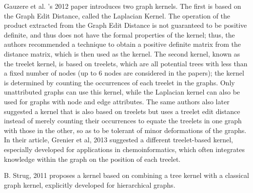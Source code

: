 Gauzere et al. 's 2012 paper introduces two graph kernels. The first is based on the Graph Edit Distance, called the Laplacian Kernel. The operation of the product extracted from the Graph Edit Distance is not guaranteed to be positive definite, and thus does not have the formal properties of the kernel; thus, the authors recommended a technique to obtain a positive definite matrix from the distance matrix, which is then used as the kernel. The second kernel, known as the treelet kernel, is based on treelets, which are all potential trees with less than a fixed number of nodes (up to 6 nodes are considered in the papers); the kernel is determined by counting the occurrences of each treelet in the graphs. Only unattributed graphs can use this kernel, while the Laplacian kernel can also be used for graphs with node and edge attributes. The same authors also later suggested a kernel that is also based on treelets but uses a treelet edit distance instead of merely counting their occurrences to equate the treelets in one graph with those in the other, so as to be tolerant of minor deformations of the graphs. In their article, Grenier et al, 2013 suggested a different treelet-based kernel, especially developed for applications in chemoinformatics, which often integrates knowledge within the graph on the position of each treelet. 

B. Strug, 2011 proposes a kernel based on combining a tree kernel with a classical graph kernel, explicitly developed for hierarchical graphs.